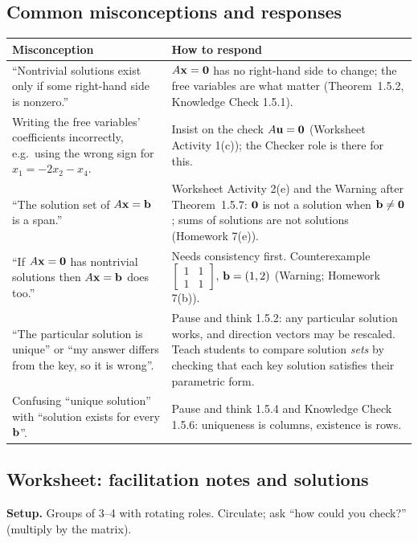 \documentclass[11pt]{article}
\begin{document}
\subsection*{Common misconceptions and responses}
\begin{center}\small
\begin{tabular}{p{2.25in}p{3.6in}}\toprule
\textbf{Misconception} & \textbf{How to respond}\\\midrule
``Nontrivial solutions exist only if some right-hand side is nonzero.'' & $A\mathbf{x}=\mathbf{0}$ has no right-hand side to change; the free variables are what matter (Theorem~1.5.2, Knowledge Check 1.5.1).\\
Writing the free variables' coefficients incorrectly, e.g.\ using the wrong sign for $x_1=-2x_2-x_4$. & Insist on the check $A\mathbf{u}=\mathbf{0}$ (Worksheet Activity 1(c)); the Checker role is there for this.\\
``The solution set of $A\mathbf{x}=\mathbf{b}$ is a span.'' & Worksheet Activity 2(e) and the Warning after Theorem~1.5.7: $\mathbf{0}$ is not a solution when $\mathbf{b}\neq\mathbf{0}$; sums of solutions are not solutions (Homework 7(e)).\\
``If $A\mathbf{x}=\mathbf{0}$ has nontrivial solutions then $A\mathbf{x}=\mathbf{b}$ does too.'' & Needs consistency first. Counterexample $\begin{bmatrix}1&1\\1&1\end{bmatrix}$, $\mathbf{b}=(1,2)$ (Warning; Homework 7(b)).\\
``The particular solution is unique'' or ``my answer differs from the key, so it is wrong''. & Pause and think 1.5.2: any particular solution works, and direction vectors may be rescaled. Teach students to compare solution \emph{sets} by checking that each key solution satisfies their parametric form.\\
Confusing ``unique solution'' with ``solution exists for every $\mathbf{b}$''. & Pause and think 1.5.4 and Knowledge Check 1.5.6: uniqueness is columns, existence is rows.\\\bottomrule
\end{tabular}
\end{center}

\subsection*{Worksheet: facilitation notes and solutions}
\textbf{Setup.} Groups of 3--4 with rotating roles. Circulate; ask ``how could you check?'' (multiply by the matrix).
\end{document}
